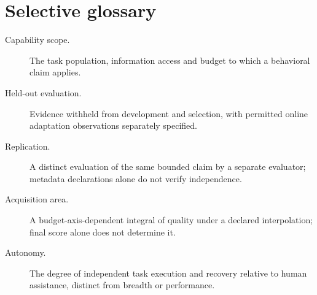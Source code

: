 \section{Selective glossary}
\begin{description}
\item[Capability scope.] The task population, information access and budget
to which a behavioral claim applies.
\item[Held-out evaluation.] Evidence withheld from development and selection,
with permitted online adaptation observations separately specified.
\item[Replication.] A distinct evaluation of the same bounded claim by a
separate evaluator; metadata declarations alone do not verify independence.
\item[Acquisition area.] A budget-axis-dependent integral of quality under a
declared interpolation; final score alone does not determine it.
\item[Autonomy.] The degree of independent task execution and recovery relative
to human assistance, distinct from breadth or performance.
\end{description}

